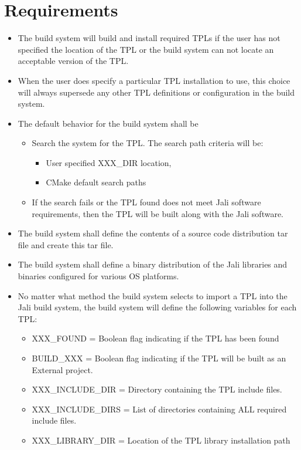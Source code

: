 \documentclass[12pt]{article}
\begin{document}
\section{Requirements}
\begin{itemize}
\item The build system will build and install required TPLs if the user has not specified the location of the TPL or
          the build system can not locate an acceptable version of the TPL.
\item When the user does specify a particular TPL installation to use, this choice will always supersede any other
          TPL definitions or configuration in the build system.
\item The default behavior for the build system shall be
\begin{itemize}
\item Search the system for the TPL. The search path criteria will be:
\begin{itemize}
\item User specified XXX\_DIR location,
\item CMake default search paths
\end{itemize}
\item If the search fails or the TPL found does not meet Jali software requirements, then the TPL will be built
          along with the Jali software.          
\end{itemize}
\item The build system shall define the contents of a source code distribution tar file and create this tar file.
\item The build system shall define a binary distribution of the Jali libraries and binaries configured for various
          OS platforms.
\item No matter what method the build system selects to import a TPL into the Jali build system, the build system 
          will define the following variables for each TPL:
\begin{itemize}
\item XXX\_FOUND = Boolean flag indicating if the TPL has been found
\item BUILD\_XXX = Boolean flag indicating if the TPL will be built as an External project.
\item XXX\_INCLUDE\_DIR = Directory containing the TPL include files.
\item XXX\_INCLUDE\_DIRS = List of directories containing ALL required include files.
\item XXX\_LIBRARY\_DIR = Location of the TPL library installation path

\end{itemize}
\end{itemize}
\end{document}
